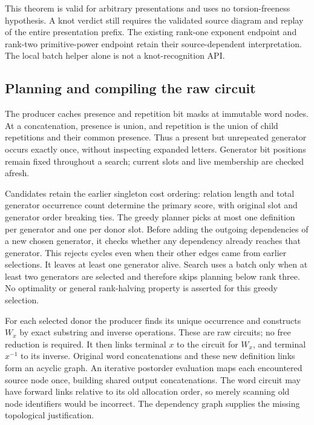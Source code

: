 This theorem is valid for arbitrary presentations and uses no
torsion-freeness hypothesis. A knot verdict still requires the validated
source diagram and replay of the entire presentation prefix. The existing
rank-one exponent endpoint and rank-two primitive-power endpoint retain
their source-dependent interpretation. The local batch helper alone is
not a knot-recognition API.

\subsection{Planning and compiling the raw circuit}

The producer caches presence and repetition bit masks at immutable word
nodes. At a concatenation, presence is union, and repetition is the union
of child repetitions and their common presence. Thus a present but
unrepeated generator occurs exactly once, without inspecting expanded
letters. Generator bit positions remain fixed throughout a search; current
slots and live membership are checked afresh.

Candidates retain the earlier singleton cost ordering: relation length
and total generator occurrence count determine the primary score, with
original slot and generator order breaking ties. The greedy planner picks
at most one definition per generator and one per donor slot. Before adding
the outgoing dependencies of a new chosen generator, it checks whether
any dependency already reaches that generator. This rejects cycles even
when their other edges came from earlier selections. It leaves at least
one generator alive. Search uses a batch only when at least two generators
are selected and therefore skips planning below rank three. No optimality
or general rank-halving property is asserted for this greedy selection.

For each selected donor the producer finds its unique occurrence and
constructs $W_x$ by exact substring and inverse operations. These are raw
circuits; no free reduction is required. It then links terminal $x$ to
the circuit for $W_x$, and terminal $x^{-1}$ to its inverse. Original word
concatenations and these new definition links form an acyclic graph.
An iterative postorder evaluation maps each encountered source node once,
building shared output concatenations. The word circuit may have forward
links relative to its old allocation order, so merely scanning old node
identifiers would be incorrect. The dependency graph supplies the missing
topological justification.

